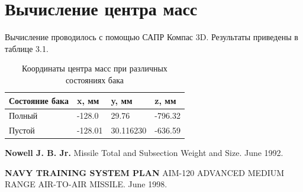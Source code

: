 \documentclass[a4paper,12pt]{report}
\begin{document}
\section{Вычисление центра масс}

Вычисление проводилось с помощью САПР Компас 3D. Результаты приведены в таблице 3.1.

\begin{table}[h]
\centering
\begin{tabular}{|p{}|p{}|p{}|p{}|}
\hline
\textbf{Состояние бака} & \textbf{x, мм} & \textbf{y, мм} & \textbf{z, мм} \\
\hline
Полный & -128.0 & 29.76 &-796.32 \\
\hline
Пустой & -128.01 & 30.116230 & -636.59 \\
\hline
\end{tabular}
\caption{Координаты центра масс при различных состояниях бака}
\label{tab:four_columns}
\end{table}


\begin{thebibliography}{9}

\bibitem{} \textbf{Nowell J. B. Jr.} Missile Total and Subsection Weight and Size. June 1992.

\bibitem{} \textbf{NAVY TRAINING SYSTEM PLAN} AIM-120 ADVANCED MEDIUM RANGE
 AIR-TO-AIR MISSILE. June 1998.

\end{thebibliography}
\end{document}
